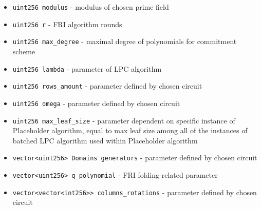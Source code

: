 \begin{itemize}
    \item \texttt{uint256 modulus} - modulus of chosen prime field
    \item \texttt{uint256 r} - FRI algorithm rounds
    \item \texttt{uint256 max\_degree} - maximal degree of polynomials for commitment scheme
    \item \texttt{uint256 lambda} - parameter of LPC algorithm
    \item \texttt{uint256 rows\_amount} - parameter defined by chosen circuit
    \item \texttt{uint256 omega} - parameter defined by chosen circuit
    \item \texttt{uint256 max\_leaf\_size} - parameter dependent on specific instance of Placeholder algorithm,
        equal to max leaf size among all of the instances of batched LPC algorithm used within Placeholder algorithm
    \item \texttt{vector<uint256> Domains generators} - parameter defined by chosen circuit 
    \item \texttt{vector<uint256> q\_polynomial} - FRI folding-related parameter
    \item \texttt{vector<vector<int256>> columns\_rotations} - parameter defined by chosen circuit
\end{itemize}
